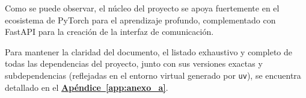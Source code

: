         
        Como se puede observar, el núcleo del proyecto se apoya fuertemente en el ecosistema de PyTorch para el aprendizaje profundo, complementado con FastAPI para la creación de la interfaz de comunicación. 

        Para mantener la claridad del documento, el listado exhaustivo y completo de todas las dependencias del proyecto, junto con sus versiones exactas y subdependencias (reflejadas en el entorno virtual generado por \texttt{uv}), se encuentra detallado en el \textbf{\hyperref[app:anexo_a]{Apéndice~\ref{app:anexo_a}}}.



        